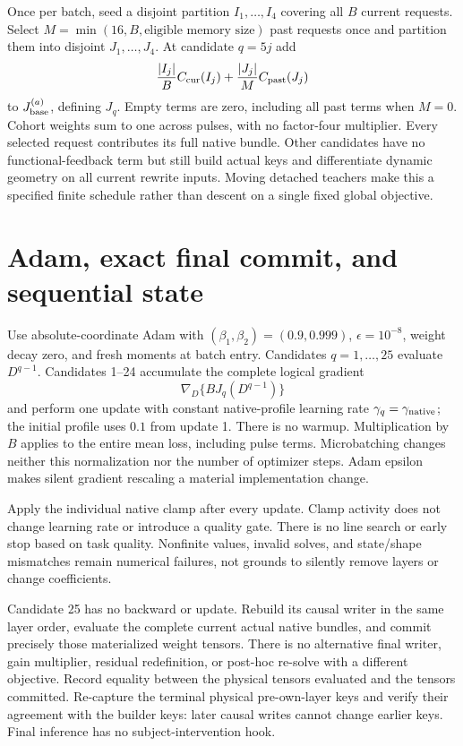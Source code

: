 \documentclass[10pt]{article}
\begin{document}
Once per batch, seed a disjoint partition $I_1,\ldots,I_4$ covering all
$B$ current requests. Select $M=\min(16,B,\text{eligible memory size})$
past requests once and partition them into disjoint $J_1,\ldots,J_4$.
At candidate $q=5j$ add
\[
 \frac{|I_j|}{B}C_{\rm cur}(I_j)+\frac{|J_j|}{M}C_{\rm past}(J_j)
\]
to $J_{\rm base}^{(a)}$, defining $J_q$. Empty terms are zero, including
all past terms when $M=0$. Cohort weights sum to one across pulses, with
no factor-four multiplier. Every selected request contributes its full
native bundle. Other candidates have no functional-feedback term but
still build actual keys and differentiate dynamic geometry on all current
rewrite inputs. Moving detached teachers make this a specified finite
schedule rather than descent on a single fixed global objective.

\newpage
\section{Adam, exact final commit, and sequential state}
Use absolute-coordinate Adam with
$(\beta_1,\beta_2)=(0.9,0.999)$, $\epsilon=10^{-8}$, weight decay zero,
and fresh moments at batch entry. Candidates $q=1,\ldots,25$ evaluate
$D^{q-1}$. Candidates 1--24 accumulate the complete logical gradient
\[
 \nabla_D\{B J_q(D^{q-1})\}
\]
and perform one update with constant native-profile learning rate
$\gamma_q=\gamma_{\rm native}$; the initial profile uses $0.1$ from
update 1. There is no warmup. Multiplication by $B$ applies to the entire
mean loss, including pulse terms. Microbatching changes neither this
normalization nor the number of optimizer steps. Adam epsilon makes
silent gradient rescaling a material implementation change.

Apply the individual native clamp after every update. Clamp activity
does not change learning rate or introduce a quality gate. There is no
line search or early stop based on task quality. Nonfinite values,
invalid solves, and state/shape mismatches remain numerical failures,
not grounds to silently remove layers or change coefficients.

Candidate 25 has no backward or update. Rebuild its causal writer in
the same layer order, evaluate the complete current actual native bundles,
and commit precisely those materialized weight tensors. There is no
alternative final writer, gain multiplier, residual redefinition, or
post-hoc re-solve with a different objective. Record equality between
the physical tensors evaluated and the tensors committed.
Re-capture the terminal physical pre-own-layer keys and verify their
agreement with the builder keys: later causal writes cannot change
earlier keys. Final inference has no subject-intervention hook.
\end{document}

